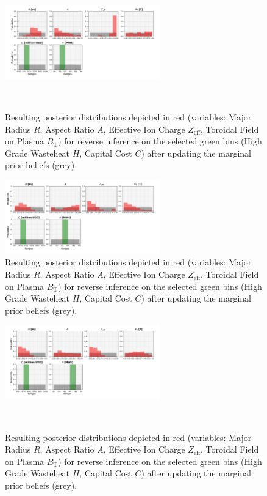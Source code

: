 \begin{figure}[ht]
    \centering
    \includegraphics[width=0.6\textwidth]{figures/TE_results/march_data/config(57)_2outputs_6.png}
    \caption{Resulting posterior distributions depicted in red (variables: Major Radius $R$, Aspect Ratio $A$, Effective Ion Charge $Z_{\text{eff}}$, Toroidal Field on Plasma $B_{\text{T}}$) for reverse
    inference on the selected green bins (High Grade Wasteheat $H$, Capital Cost $C$) after updating the marginal prior beliefs (grey).}~\label{fig:config(57)_2outputs_6}
\end{figure}

\begin{figure}[ht]
    \centering
    \includegraphics[width=0.6\textwidth]{figures/TE_results/march_data/config(57)_2outputs_7.png}
    \caption{Resulting posterior distributions depicted in red (variables: Major Radius $R$, Aspect Ratio $A$, Effective Ion Charge $Z_{\text{eff}}$, Toroidal Field on Plasma $B_{\text{T}}$) for reverse
    inference on the selected green bins (High Grade Wasteheat $H$, Capital Cost $C$) after updating the marginal prior beliefs (grey).}\label{fig:config(57)_2outputs_7}
\end{figure}

\begin{figure}[ht]
    \centering
    \includegraphics[width=0.6\textwidth]{figures/TE_results/march_data/config(57)_2outputs_8.png}
    \caption{Resulting posterior distributions depicted in red (variables: Major Radius $R$, Aspect Ratio $A$, Effective Ion Charge $Z_{\text{eff}}$, Toroidal Field on Plasma $B_{\text{T}}$) for reverse
    inference on the selected green bins (High Grade Wasteheat $H$, Capital Cost $C$) after updating the marginal prior beliefs (grey).}~\label{fig:config(57)_2outputs_8}
\end{figure}

